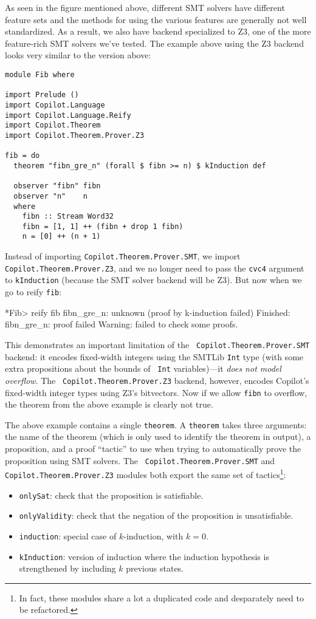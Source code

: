 As seen in the figure mentioned above, different SMT solvers have different
feature sets and the methods for using the various features are generally not
well standardized. As a result, we also have backend specialized to Z3, one of
the more feature-rich SMT solvers we've tested. The example above using the Z3
backend looks very similar to the version above:

\begin{lstlisting}[language = Copilot]
module Fib where

import Prelude ()
import Copilot.Language
import Copilot.Language.Reify
import Copilot.Theorem
import Copilot.Theorem.Prover.Z3

fib = do
  theorem "fibn_gre_n" (forall $ fibn >= n) $ kInduction def

  observer "fibn" fibn
  observer "n"    n
  where
    fibn :: Stream Word32
    fibn = [1, 1] ++ (fibn + drop 1 fibn)
    n = [0] ++ (n + 1)
\end{lstlisting}

Instead of importing {\tt Copilot.Theorem.Prover.SMT}, we import {\tt
Copilot.Theorem.Prover.Z3}, and we no longer need to pass the {\tt cvc4}
argument to {\tt kInduction} (because the SMT solver backend will be Z3). But
now when we go to reify {\tt fib}:

\begin{code}
*Fib> reify fib
fibn_gre_n: unknown (proof by k-induction failed)
Finished: fibn_gre_n: proof failed
Warning: failed to check some proofs.
\end{code}

This demonstrates an important limitation of the {\tt
Copilot.Theorem.Prover.SMT} backend: it encodes fixed-width integers using the
SMTLib {\tt Int} type (with some extra propositions about the bounds of {\tt
Int} variables)---it {\em does not model overflow}. The {\tt
Copilot.Theorem.Prover.Z3} backend, however, encodes Copilot's fixed-width
integer types using Z3's bitvectors. Now if we allow {\tt fibn} to overflow, the
theorem from the above example is clearly not true.

The above example contains a single {\tt theorem}. A {\tt theorem} takes three
arguments: the name of the theorem (which is only used to identify the theorem
in output), a proposition, and a proof ``tactic'' to use when trying to
automatically prove the proposition using SMT solvers. The {\tt
Copilot.Theorem.Prover.SMT} and {\tt Copilot.Theorem.Prover.Z3} modules both
export the same set of tactics\footnote{In fact, these modules share a lot a
duplicated code and desparately need to be refactored.}:
\begin{itemize}
\item {\tt onlySat}: check that the proposition is satisfiable.
\item {\tt onlyValidity}: check that the negation of the proposition is
unsatisfiable.
\item {\tt induction}: special case of $k$-induction, with $k = 0$.
\item {\tt kInduction}: version of induction where the induction hypothesis is
strengthened by including $k$ previous states.
\end{itemize}

